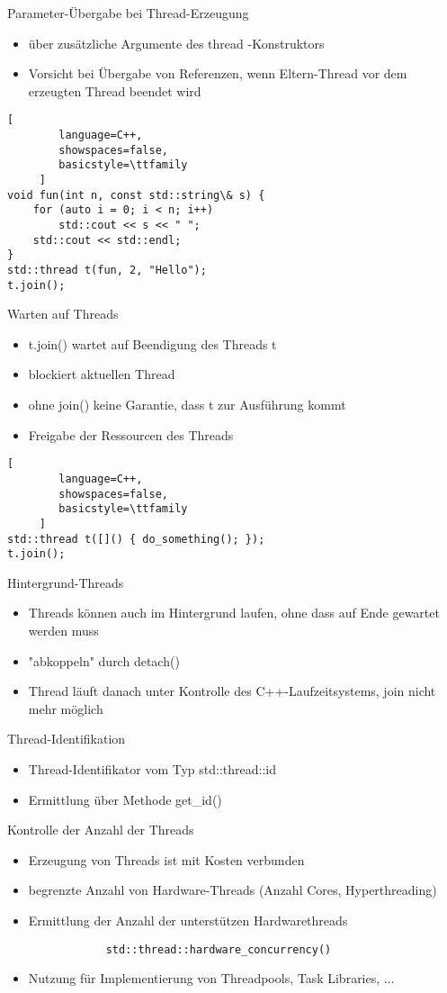 \documentclass[10pt]{article}
\begin{document}
Parameter-Übergabe bei Thread-Erzeugung
\begin{itemize}
  \item über zusätzliche Argumente des thread -Konstruktors
  \item Vorsicht bei Übergabe von Referenzen, wenn Eltern-Thread vor dem erzeugten Thread beendet wird
\end{itemize}
\begin{lstlisting}[
        language=C++,
        showspaces=false,
        basicstyle=\ttfamily
     ]
void fun(int n, const std::string\& s) {
    for (auto i = 0; i < n; i++)
        std::cout << s << " ";
    std::cout << std::endl;
}
std::thread t(fun, 2, "Hello");
t.join();
\end{lstlisting}

Warten auf Threads
\begin{itemize}
  \item t.join() wartet auf Beendigung des Threads t
  \item blockiert aktuellen Thread
  \item ohne join() keine Garantie, dass t zur Ausführung kommt
  \item Freigabe der Ressourcen des Threads
\end{itemize}
\begin{lstlisting}[
        language=C++,
        showspaces=false,
        basicstyle=\ttfamily
     ]
std::thread t([]() { do_something(); });
t.join();
\end{lstlisting}

Hintergrund-Threads
\begin{itemize}
  \item Threads können auch im Hintergrund laufen, ohne dass auf Ende gewartet werden muss
  \item "abkoppeln" durch detach()
  \item Thread läuft danach unter Kontrolle des C++-Laufzeitsystems, join nicht mehr möglich
\end{itemize}

Thread-Identifikation
\begin{itemize}
  \item Thread-Identifikator vom Typ std::thread::id
  \item Ermittlung über Methode get\_id()
\end{itemize}

Kontrolle der Anzahl der Threads
\begin{itemize}
  \item Erzeugung von Threads ist mit Kosten verbunden
  \item begrenzte Anzahl von Hardware-Threads (Anzahl Cores, Hyperthreading)
  \item Ermittlung der Anzahl der unterstützen Hardwarethreads
        \begin{lstlisting}
            std::thread::hardware_concurrency()
          \end{lstlisting}
  \item Nutzung für Implementierung von Threadpools, Task Libraries, ...
\end{itemize}
\end{document}
